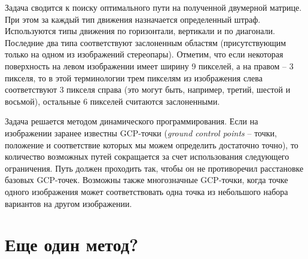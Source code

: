 Задача сводится к поиску оптимального пути на
полученной двумерной матрице. При этом за каждый
тип движения назначается определенный штраф. Используются типы движения по горизонтали, вертикали и по диагонали. Последние два типа соответствуют
заслоненным областям (присутствующим только на
одном из изображений стереопары). Отметим, что
если некоторая поверхность на левом изображении
имеет ширину 9 пикселей, а на правом -- 3 пикселя, то
в этой терминологии трем пикселям из изображения
слева соответствуют 3 пикселя справа (это могут
быть, например, третий, шестой и восьмой), остальные 6 пикселей считаются заслоненными.

Задача решается методом динамического программирования. Если на изображении заранее известны GCP-точки (\textit{ground control points} -- точки, положение и соответствие которых мы можем определить
достаточно точно), то количество возможных путей
сокращается за счет использования следующего ограничения. Путь должен проходить так, чтобы он не
противоречил расстановке базовых GCP-точек. Возможны также многозначные GCP-точки, когда точке
одного изображения может соответствовать одна точка из небольшого набора вариантов на другом изображении.

\section{Еще один метод?}